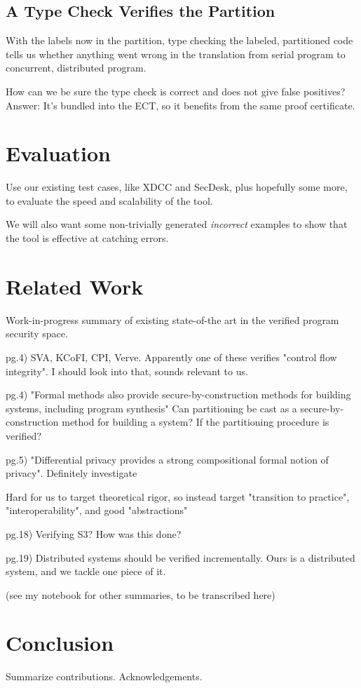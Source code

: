 \documentclass[conference,compsoc]{IEEEtran}
\begin{document}
    \subsection{A Type Check Verifies the Partition}

        With the labels now in the partition, type checking the labeled,
        partitioned code tells us whether anything went wrong in the translation
        from serial program to concurrent, distributed program.

        How can we be sure the type check is correct and does not give false
        positives? Answer: It's bundled into the ECT, so it benefits from the
        same proof certificate.

\section{Evaluation}

    Use our existing test cases, like XDCC and SecDesk, plus hopefully
    some more, to evaluate the speed and scalability of the tool.

    We will also want some non-trivially generated \textit{incorrect} examples
    to show that the tool is effective at catching errors.

\section{Related Work}

    Work-in-progress summary of existing state-of-the art in the verified
    program security space.

    pg.4) SVA, KCoFI, CPI, Verve. Apparently one of these verifies "control flow
    integrity". I should look into that, sounds relevant to us.

    pg.4) "Formal methods also provide secure-by-construction methods for
    building systems, including program synthesis" Can partitioning be cast as
    a secure-by-construction method for building a system? If the partitioning
    procedure is verified?

    pg.5) "Differential privacy provides a strong compositional formal
    notion of privacy". Definitely investigate

    Hard for us to target theoretical rigor, so instead target "transition to
    practice", "interoperability", and good "abstractions"

    pg.18) Verifying S3? How was this done?

    pg.19) Distributed systems should be verified incrementally. Ours is a
    distributed system, and we tackle one piece of it. \cite{chong2016report}

    (see my notebook for other summaries, to be transcribed here)

\section{Conclusion}

    Summarize contributions. Acknowledgements.





\let\thefootnote\relax{}


\end{document}
